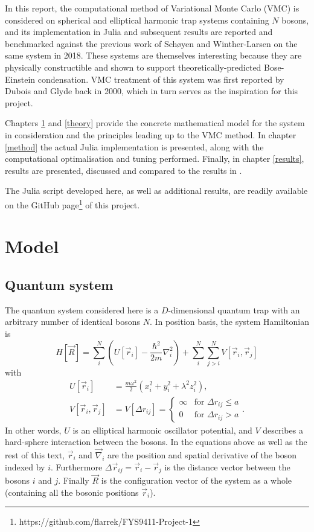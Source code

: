 \documentclass[a4paper,8pt]{article}
\begin{document}
\begin{multicols}{2}
In this report, the computational method of Variational Monte Carlo (VMC) is considered on spherical and elliptical harmonic trap systems containing $N$ bosons, and its implementation in Julia and subsequent results are reported and benchmarked against the previous work of Schøyen and Winther-Larsen\cite{SWL} on the same system in 2018. These systems are themselves interesting because they are physically constructible and shown to support theoretically-predicted Bose-Einstein condensation.\cite{AEMWC} VMC treatment of this system was first reported by Dubois and Glyde\cite{DBG} back in 2000, which in turn serves as the inspiration for this project.

Chapters \ref{model} and \ref{theory} provide the concrete mathematical model for the system in consideration and the principles leading up to the VMC method. In chapter \ref{method} the actual Julia implementation is presented, along with the computational optimalisation and tuning performed. Finally, in chapter \ref{results}, results are presented, discussed and compared to the results in \cite{SWL}.

The Julia script developed here, as well as additional results, are readily available on the GitHub page\footnote{https://github.com/flarrek/FYS9411-Project-1} of this project.



\section{Model} \label{model}

\subsection{Quantum system}\label{system}
The quantum system considered here is a $D$-dimensional quantum trap with an arbitrary number of identical bosons $N$. In position basis, the system Hamiltonian is
\begin{equation}\label{dimHam}
H[\vec{R}] = \sum\limits_i^N \left(U[\vec{r}_i] -\frac{\hbar^2}{2m}\nabla_i^2 \right) + \sum\limits_i^N\sum\limits_{j > i}^N V[\vec{r}_i,\vec{r}_j]
\end{equation}
with
\begin{align}
U[\vec{r}_i] &= \frac{m\omega^2}{2}\left(x_i^2+y_i^2+\lambda^2z_i^2\right), \\
V[\vec{r}_i,\vec{r}_j] &= V[\Delta{r}_{ij}] =\begin{cases} \infty & \text{for $\Delta{r}_{ij} \leq a$} \\
0 & \text{for $\Delta{r}_{ij} > a$} \end{cases}.
\end{align}
In other words, $U$ is an elliptical harmonic oscillator potential, and $V$ describes a hard-sphere interaction between the bosons. In the equations above as well as the rest of this text, $\vec{r}_i$ and $\vec{\nabla}_i$ are the position and spatial derivative of the boson indexed by $i$. Furthermore $\Delta\vec{r}_{ij} = \vec{r}_i-\vec{r}_j$ is the distance vector between the bosons $i$ and $j$. Finally $\vec{R}$ is the configuration vector of the system as a whole (containing all the bosonic positions $\vec{r}_i$).


\end{multicols}
\end{document}
